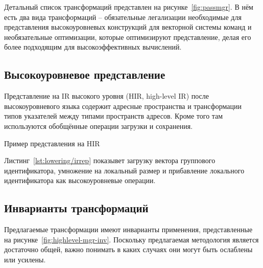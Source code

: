 Детальный список трансформаций представлен на рисунке~\cref{fig:passmgr}. В нём есть два вида трансформаций -- обязательные легализации необходимые для представления высокоуровневых конструкций для векторной системы команд и необязательные оптимизации, которые оптимизируют представление, делая его более подходящим для высокоэффективных вычислений.

\subsection{Высокоуровневое представление}\label{subsec:lowering/passes/highlevel}

Представление на IR высокого уровня (HIR, high-level IR) после высокоуровневого языка содержит адресные пространства и трансформации типов указателей между типами пространств адресов. Кроме того там используются обобщённые операции загрузки и сохранения.

\begin{ListingEnv}[!h]
    \captiondelim{ } 
    \caption{Пример представления на HIR}\label{lst:lowering/irrep}
    \begin{Verb}
    \end{Verb}
\end{ListingEnv}

Листинг~\cref{lst:lowering/irrep} показывет загрузку вектора группового идентификатора, умножение на локальный размер и прибавление локального идентификатора как высокоуровневые операции.

\subsection{Инварианты трансформаций}\label{subsec:lowering/passes/invariants}

Предлагаемые трансформации имеют инварианты применения, представленные на рисунке~\cref{fig:highlevel-mgr-inv}. Поскольку предлагаемая методология является достаточно общей, важно понимать в каких случаях они могут быть ослаблены или усилены.

